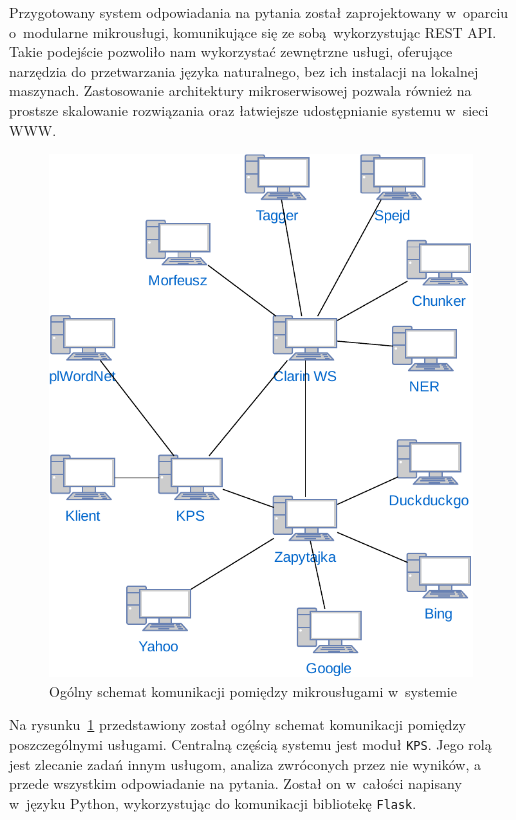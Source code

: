 
Przygotowany system odpowiadania na pytania został zaprojektowany w~oparciu o~modularne mikrousługi, komunikujące się ze sobą wykorzystując REST API. Takie podejście pozwoliło nam wykorzystać zewnętrzne usługi, oferujące narzędzia do przetwarzania języka naturalnego, bez ich instalacji na lokalnej maszynach. Zastosowanie architektury mikroserwisowej pozwala również na prostsze skalowanie rozwiązania oraz łatwiejsze udostępnianie systemu w~sieci WWW.

\begin{figure}[h]
    \centering
    \includegraphics[width=\columnwidth]{figures/WEDT-Uslugi.pdf}
    \caption{Ogólny schemat komunikacji pomiędzy mikrousługami w~systemie}
    \label{fig:microservices}
\end{figure}

Na rysunku~\ref{fig:microservices} przedstawiony został ogólny schemat komunikacji pomiędzy poszczególnymi usługami. Centralną częścią systemu jest moduł \texttt{KPS}. Jego rolą jest zlecanie zadań innym usługom, analiza zwróconych przez nie wyników, a przede wszystkim odpowiadanie na pytania. Został on w~całości napisany w~języku Python, wykorzystując do komunikacji bibliotekę \texttt{Flask}.

